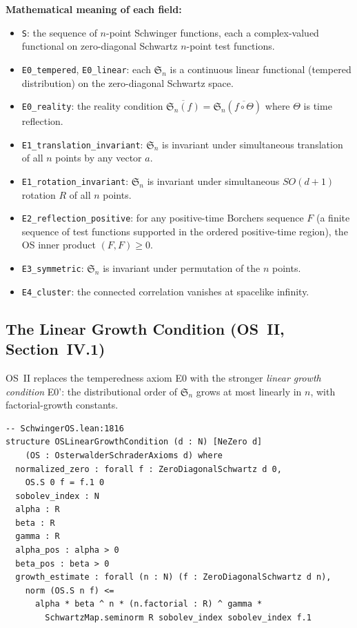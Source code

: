 \documentclass[11pt,a4paper]{article}
\begin{document}
\noindent\textbf{Mathematical meaning of each field:}
\begin{itemize}
\item \texttt{S}: the sequence of $n$-point Schwinger functions, each a
  complex-valued functional on zero-diagonal Schwartz $n$-point test functions.
\item \texttt{E0\_tempered}, \texttt{E0\_linear}: each $\mathfrak{S}_n$ is a
  continuous linear functional (tempered distribution) on the zero-diagonal
  Schwartz space.
\item \texttt{E0\_reality}: the reality condition
  $\overline{\mathfrak{S}_n(f)} = \mathfrak{S}_n(\overline{f \circ \Theta})$
  where $\Theta$ is time reflection.
\item \texttt{E1\_translation\_invariant}: $\mathfrak{S}_n$ is invariant under
  simultaneous translation of all $n$ points by any vector $a$.
\item \texttt{E1\_rotation\_invariant}: $\mathfrak{S}_n$ is invariant under
  simultaneous $SO(d{+}1)$ rotation $R$ of all $n$ points.
\item \texttt{E2\_reflection\_positive}: for any positive-time Borchers sequence
  $F$ (a finite sequence of test functions supported in the ordered positive-time
  region), the OS inner product $(F, F) \geq 0$.
\item \texttt{E3\_symmetric}: $\mathfrak{S}_n$ is invariant under permutation
  of the $n$ points.
\item \texttt{E4\_cluster}: the connected correlation vanishes at spacelike
  infinity.
\end{itemize}

\subsection{The Linear Growth Condition (OS~II, Section~IV.1)}

OS~II replaces the temperedness axiom E0 with the stronger \emph{linear growth
condition} E0': the distributional order of $\mathfrak{S}_n$ grows at most
linearly in $n$, with factorial-growth constants.

\begin{lstlisting}
-- SchwingerOS.lean:1816
structure OSLinearGrowthCondition (d : N) [NeZero d]
    (OS : OsterwalderSchraderAxioms d) where
  normalized_zero : forall f : ZeroDiagonalSchwartz d 0,
    OS.S 0 f = f.1 0
  sobolev_index : N
  alpha : R
  beta : R
  gamma : R
  alpha_pos : alpha > 0
  beta_pos : beta > 0
  growth_estimate : forall (n : N) (f : ZeroDiagonalSchwartz d n),
    norm (OS.S n f) <=
      alpha * beta ^ n * (n.factorial : R) ^ gamma *
        SchwartzMap.seminorm R sobolev_index sobolev_index f.1
\end{lstlisting}
\end{document}
